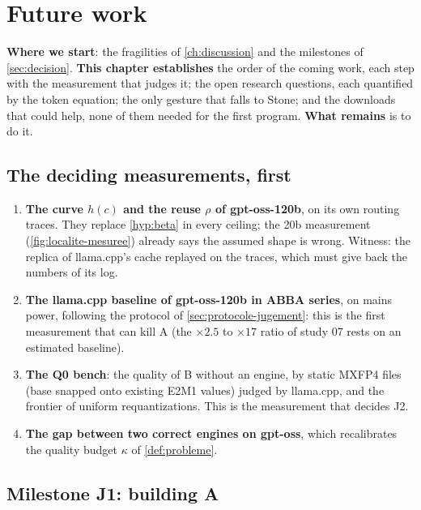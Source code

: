 \chapter{Future work}\label{ch:futurs}

\begin{origine}
\textbf{Where we start}: the fragilities of \cref{ch:discussion} and the milestones of \cref{sec:decision}.
\textbf{This chapter establishes} the order of the coming work, each step with the measurement that judges it; the open research questions, each quantified by the token equation; the only gesture that falls to Stone; and the downloads that could help, none of them needed for the first program.
\textbf{What remains} is to do it.
\end{origine}

\section{The deciding measurements, first}\label{sec:mesures-decident}

\begin{enumerate}
\item \textbf{The curve $h(c)$ and the reuse $\rho$ of gpt-oss-120b}, on its own routing traces. They replace \cref{hyp:beta} in every ceiling; the 20b measurement (\cref{fig:localite-mesuree}) already says the assumed shape is wrong. Witness: the replica of llama.cpp's cache replayed on the traces, which must give back the numbers of its log.
\item \textbf{The llama.cpp baseline of gpt-oss-120b in ABBA series}, on mains power, following the protocol of \cref{sec:protocole-jugement}: this is the first measurement that can kill A (the $\times 2.5$ to $\times 17$ ratio of study 07 rests on an estimated baseline).
\item \textbf{The Q0 bench}: the quality of B without an engine, by static MXFP4 files (base snapped onto existing E2M1 values) judged by llama.cpp, and the frontier of uniform requantizations. This is the measurement that decides J2.
\item \textbf{The gap between two correct engines on gpt-oss}, which recalibrates the quality budget $\kappa$ of \cref{def:probleme}.
\end{enumerate}

\section{Milestone J1: building A}\label{sec:construire-j1}


